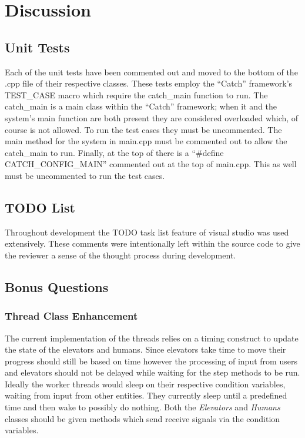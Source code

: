 \documentclass{article}
\begin{document}
\section{Discussion}

\subsection{Unit Tests}
Each of the unit tests have been commented out and moved to the bottom of the .cpp file of their respective classes.
These tests employ the ``Catch'' framework's TEST\_CASE macro which require the catch\_main function to run.
The catch\_main is a main class within the ``Catch'' framework; when it and the system's main function are both present they are considered overloaded which, of course is not allowed.
To run the test cases they must be uncommented.
The main method for the system in main.cpp must be commented out to allow the catch\_main to run.
Finally, at the top of there is a ``\#define CATCH\_CONFIG\_MAIN'' commented out at the top of main.cpp.
This as well must be uncommented to run the test cases.
\subsection{TODO List}
Throughout development the TODO task list feature of visual studio was used extensively.
These comments were intentionally left within the source code to give the reviewer a sense of the thought process during development.
\subsection{Bonus Questions}

\subsubsection{Thread Class Enhancement}
The current implementation of the threads relies on a timing construct to update the state of the elevators and humans.
Since elevators take time to move their progress should still be based on time however the processing of input from users and elevators should not be delayed while waiting for the step methods to be run.
Ideally the worker threads would sleep on their respective condition variables, waiting from input from other entities.
They currently sleep until a predefined time and then wake to possibly do nothing.
Both the \textit{Elevators} and \textit{Humans} classes should be given methods which send receive signals via the condition variables.
\end{document}
